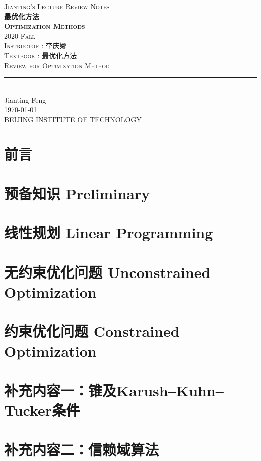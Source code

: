 \documentclass[11pt,titlepage]{book}
\begin{document}
\begin{titlepage}
	\centering
    \textsc{\LARGE Jianting's Lecture Review Notes}\\ \vspace{\fill}
    \textbf{\textsc{\fontsize{20}{20}\selectfont 最优化方法\\ Optimization Methods}}\\ \vspace{\fill}
    \medskip
    \textsc{2020 Fall}\\
    \medskip
    \textsc{Instructor : 李庆娜}\\
    \medskip
    \textsc{Textbook : 最优化方法}\\
    \bigskip
	\textsc{Review for Optimization Method}\\[0.4cm]
	\rule{\linewidth}{0.2 mm} \\[0.5 cm]
	Jianting Feng\\
	\today\\
	BEIJING INSTITUTE OF TECHNOLOGY
\end{titlepage}
\restoregeometry

\frontmatter 
\chapter{前言}

\newpage
\tableofcontents
\newpage
\thispagestyle{numberonly}
\mainmatter 
\chapter{预备知识 Preliminary}

\chapter{线性规划 Linear Programming}

\chapter{无约束优化问题 Unconstrained Optimization}

\chapter{约束优化问题 Constrained Optimization}

\chapter{补充内容一：锥及Karush–Kuhn–Tucker条件}\label{cone}

\chapter{补充内容二：信赖域算法}

\clearpage
\pagestyle{numberonly}
\printbibliography
\end{document}
